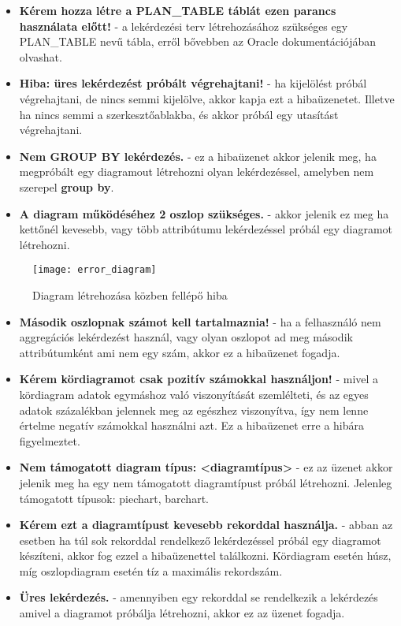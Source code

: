 \begin{itemize}
  \item \textbf{Kérem hozza létre a PLAN\_TABLE táblát ezen parancs használata előtt!} - a lekérdezési terv létrehozásához szükséges egy PLAN\_TABLE nevű tábla,
  erről bővebben az Oracle dokumentációjában\cite{oracledocsref} olvashat.
  \item \textbf{Hiba: üres lekérdezést próbált végrehajtani!} - ha kijelölést próbál végrehajtani, de nincs semmi kijelölve, akkor kapja ezt a hibaüzenetet. Illetve ha
  nincs semmi a szerkesztőablakba, és akkor próbál egy utasítást végrehajtani.
  \item \textbf{Nem GROUP BY lekérdezés.} - ez a hibaüzenet akkor jelenik meg, ha megpróbált egy diagramout létrehozni olyan lekérdezéssel, amelyben nem szerepel \textbf{group by}.
  \item \textbf{A diagram működéséhez 2 oszlop szükséges.} - akkor jelenik ez meg ha kettőnél kevesebb, vagy több attribútumu lekérdezéssel próbál egy diagramot létrehozni.
\end{itemize}

\begin{figure}[ht]
  \begin{center}
  \texttt{[image: error\_diagram]}
  \end{center}
 \caption{Diagram létrehozása közben fellépő hiba}
\end{figure}

\begin{itemize}
  \item \textbf{Második oszlopnak számot kell tartalmaznia!} - ha a felhasználó nem aggregációs lekérdezést használ, vagy olyan oszlopot ad meg második attribútumként ami nem egy
  szám, akkor ez a hibaüzenet fogadja.
  \item \textbf{Kérem kördiagramot csak pozitív számokkal használjon!} - mivel a kördiagram adatok egymáshoz való viszonyítását szemlélteti, és az egyes adatok százalékban jelennek meg
  az egészhez viszonyítva, így nem lenne értelme negatív számokkal használni azt. Ez a hibaüzenet erre a hibára figyelmeztet.
  \item \textbf{Nem támogatott diagram típus: <diagramtípus>} - ez az üzenet akkor jelenik meg ha egy nem támogatott diagramtípust próbál létrehozni.
  Jelenleg támogatott típusok: piechart, barchart.
  \item \textbf{Kérem ezt a diagramtípust kevesebb rekorddal használja.} - abban az esetben ha túl sok rekorddal rendelkező lekérdezéssel próbál egy diagramot készíteni, akkor
  fog ezzel a hibaüzenettel találkozni. Kördiagram esetén húsz, míg oszlopdiagram esetén tíz a maximális rekordszám.
  \item \textbf{Üres lekérdezés.} - amennyiben egy rekorddal se rendelkezik a lekérdezés amivel a diagramot próbálja létrehozni, akkor ez az üzenet fogadja.
\end{itemize}

